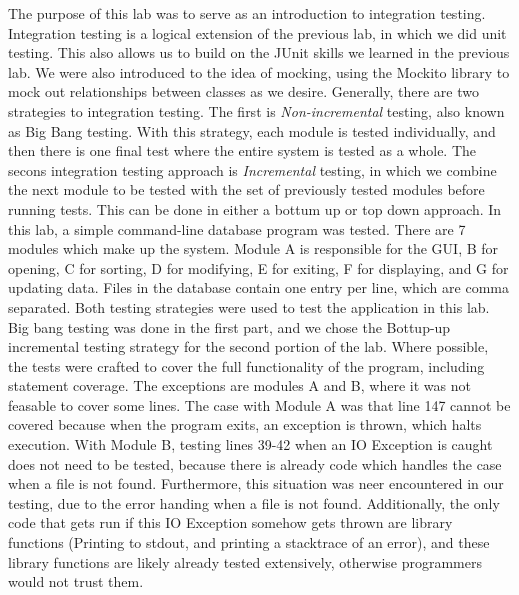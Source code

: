 The purpose of this lab was to serve as an introduction to integration testing.
Integration testing is a logical extension of the previous lab, in which we did
unit testing. This also allows us to build on the JUnit skills we learned in the
previous lab. We were also introduced to the idea of mocking, using the Mockito
library to mock out relationships between classes as we desire. Generally, there
are two strategies to integration testing. The first is \textit{Non-incremental}
testing, also known as Big Bang testing. With this strategy, each module is
tested individually, and then there is one final test where the entire system is
tested as a whole. The secons integration testing approach is
\textit{Incremental} testing, in which we combine the next module to be tested
with the set of previously tested modules before running tests. This can be done
in either a bottum up or top down approach. In this lab, a simple command-line
database program was tested. There are 7 modules which make up the system.
Module A is responsible for the GUI, B for opening, C for sorting, D for
modifying, E for exiting, F for displaying, and G for updating data. Files in
the database contain one entry per line, which are comma separated. Both testing
strategies were used to test the application in this lab. Big bang testing was
done in the first part, and we chose the Bottup-up incremental testing strategy
for the second portion of the lab. Where possible, the tests were crafted to
cover the full functionality of the program, including statement coverage. The
exceptions are modules A and B, where it was not feasable to cover some lines.
The case with Module A was that line 147 cannot be covered because when the
program exits, an exception is thrown, which halts execution. With Module B,
testing lines 39-42 when an IO Exception is caught does not need to be tested,
because there is already code which handles the case when a file is not found.
Furthermore, this situation was neer encountered in our testing, due to the
error handing when a file is not found. Additionally, the only code that gets
run if this IO Exception somehow gets thrown are library functions (Printing to
stdout, and printing a stacktrace of an error), and these library functions are
likely already tested extensively, otherwise programmers would not trust them. 

